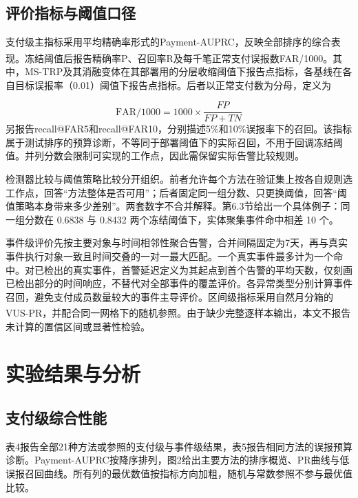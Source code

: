\documentclass[a4paper,fleqn]{cas-dc}
\newcommand{\upcite}[1]{\textsuperscript{\cite{#1}}}
\begin{document}
\subsection{评价指标与阈值口径}
支付级主指标采用平均精确率形式的Payment-AUPRC，反映全部排序的综合表现\upcite{ref19}。冻结阈值后报告精确率P、召回率R及每千笔正常支付误报数FAR/1000。其中，MS-TRP及其消融变体在其部署用的分层收缩阈值下报告点指标，各基线在各自目标误报率（0.01）阈值下报告点指标。后者以正常支付数为分母，定义为

\begin{equation}
\mathrm{FAR}/1000 = 1000 \times \frac{FP}{FP + TN}
\end{equation}
另报告recall@FAR5和recall@FAR10，分别描述5\%和10\%误报率下的召回。该指标属于测试排序的预算诊断，不等同于部署阈值下的实际召回，不用于回调冻结阈值。并列分数会限制可实现的工作点，因此需保留实际告警比较规则。

检测器比较与阈值策略比较分开组织。前者允许每个方法在验证集上按各自规则选工作点，回答“方法整体是否可用”；后者固定同一组分数、只更换阈值，回答“阈值策略本身带来多少差别”。两套数字不合并解释。第6.3节给出一个具体例子：同一组分数在 0.6838 与 0.8432 两个冻结阈值下，实体聚集事件命中相差 10 个。

事件级评价先按主要对象与时间相邻性聚合告警，合并间隔固定为7天，再与真实事件执行对象一致且时间交叠的一对一最大匹配。一个真实事件最多计为一个命中。对已检出的真实事件，首警延迟定义为其起点到首个告警的平均天数，仅刻画已检出部分的时间响应，不替代对全部事件的覆盖评价。各异常类型分别计算事件召回，避免支付成员数量较大的事件主导评价。区间级指标采用自然月分箱的VUS-PR，并配合同一网格下的随机参照\upcite{ref20}。由于缺少完整逐样本输出，本文不报告未计算的置信区间或显著性检验。

\section{实验结果与分析}
\subsection{支付级综合性能}
表4报告全部21种方法或参照的支付级与事件级结果，表5报告相同方法的误报预算诊断。Payment-AUPRC按降序排列，图2给出主要方法的排序概览、PR曲线与低误报召回曲线。所有列的最优数值按指标方向加粗，随机与常数参照不参与最优值比较。
\end{document}
